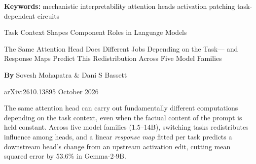 \documentclass[10pt,twocolumn]{article}
\begin{document}
\setlength{\parindent}{0pt}
\setlength{\parskip}{4pt}

{\small\color{keywordgray}\textbf{Keywords:}
  mechanistic interpretability \textbullet{}
  attention heads \textbullet{}
  activation patching \textbullet{}
  task-dependent circuits}\par\vspace{4pt}

{\LARGE\bfseries\raggedright
  Task Context Shapes Component Roles in Language Models}\par\vspace{4pt}

{\large\itshape\raggedright
  The Same Attention Head Does Different Jobs Depending on the Task---
  and Response Maps Predict This Redistribution Across Five Model Families}\par\vspace{6pt}

{\small\textbf{By} Sovesh Mohapatra \& Dani S Bassett}\par\vspace{2pt}

{\small\color{keywordgray}arXiv:2610.13895 \textbullet{} October 2026}
\par\vspace{2pt}\noindent{\color{rulered}\rule{\columnwidth}{0.6pt}}\vspace{6pt}

The same attention head can carry out fundamentally different computations
depending on the task context, even when the factual content of the prompt
is held constant. Across five model families (1.5--14B), switching tasks
redistributes influence among heads, and a linear \emph{response map} fitted
per task predicts a downstream head's change from an upstream activation edit,
cutting mean squared error by 53.6\% in Gemma-2-9B.
\end{document}
